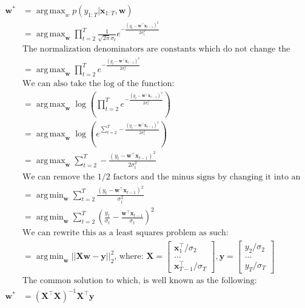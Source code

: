 \documentclass[11pt,a4paper,oneside]{report}
\DeclareMathOperator*{\argmin}{arg\,min}
\DeclareMathOperator*{\argmax}{arg\,max}
\begin{document}
\begin{align*}
\mathbf{w}^\ast&=\argmax_{w}p(y_{1:T}|\mathbf{x}_{1:T},\mathbf{w})\\
&=\argmax_{\mathbf{w}}\prod_{t=2}^T\frac{1}{\sqrt{2\pi}\sigma_t}e^{-\frac{(y_t-\mathbf{w}^\top\mathbf{x}_{t-1})^2}{2\sigma_t^2}}\\
&\text{The normalization denominators are constants which do not change the solution:}\\
&=\argmax_{\mathbf{w}}\prod_{t=2}^Te^{-\frac{(y_t-\mathbf{w}^\top\mathbf{x}_{t-1})^2}{2\sigma_t^2}}\\
&\text{We can also take the log of the function:}\\
&=\argmax_{\mathbf{w}}\log\left(\prod_{t=2}^Te^{-\frac{(y_t-\mathbf{w}^\top\mathbf{x}_{t-1})^2}{2\sigma_t^2}}\right)\\
&=\argmax_{\mathbf{w}}\log\left(e^{\sum_{t=2}^T-\frac{(y_t-\mathbf{w}^\top\mathbf{x}_{t-1})^2}{2\sigma_t^2}}\right)\\
&=\argmax_{\mathbf{w}}\sum_{t=2}^T-\frac{(y_t-\mathbf{w}^\top\mathbf{x}_{t-1})^2}{2\sigma_t^2}\\
&\text{We can remove the 1/2 factors and the minus signs by changing it into an argmin:}\\
&=\argmin_{\mathbf{w}}\sum_{t=2}^T\frac{(y_t-\mathbf{w}^\top\mathbf{x}_{t-1})^2}{\sigma_t^2}\\
&=\argmin_{\mathbf{w}}\sum_{t=2}^T\left(\frac{y_t}{\sigma_t}-\frac{\mathbf{w}^\top\mathbf{x}_{t-1}}{\sigma_t}\right)^2\\
&\text{We can rewrite this as a least squares problem as such:}\\
&=\argmin_{\mathbf{w}}||\mathbf{X}\mathbf{w}-\mathbf{y}||_2^2\text{, where: }\mathbf{X}=\left[ { \begin{array}{c} \mathbf{x}_1^\top/\sigma_2\\ ... \\ \mathbf{x}_{T-1}^\top/\sigma_T  \end{array} } \right], \mathbf{y}=\left[ { \begin{array}{c} y_2/\sigma_2\\ ... \\ y_{T}/\sigma_T  \end{array} } \right]\\
&\text{The common solution to which, is well known as the following:}\\
\mathbf{w}^\ast&=(\mathbf{X}^\top\mathbf{X})^{-1}\mathbf{X}^\top\mathbf{y}
\end{align*}
\end{document}
